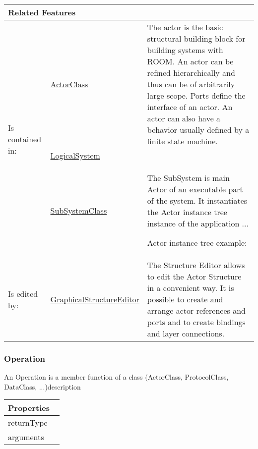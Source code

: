 			\vspace{\baselineskip}
			\begingroup
			\renewcommand{\arraystretch}{1.8} %
			\parbox{\textwidth}{
			\begin{longtable}{l l p{}}
				\multicolumn{2}{l}{\textbf{\large Related Features}} & \\
				\hline
			\multirow{3}{*}{Is contained in:} & \tabitem \hyperlink{ref:ActorClass}{ActorClass}  & The actor is the basic structural building block for building systems with ROOM. An actor can be refined hierarchically and thus can be of arbitrarily large scope. Ports define the interface of an actor. An actor can also have a behavior usually defined by a finite state machine. \\
			& \tabitem \hyperlink{ref:LogicalSystem}{LogicalSystem}  &  \\
			& \tabitem \hyperlink{ref:SubSystemClass}{SubSystemClass}  & The SubSystem is main Actor of an executable part of the system. It instantiates the Actor instance tree instance of the application ...
				
				Actor instance tree example:
				 \\
			\hline
			Is edited by: & \tabitem \hyperlink{ref:GraphicalStructureEditor}{GraphicalStructureEditor}  & The Structure Editor allows to edit the Actor Structure in a convenient way. It is possible to create and arrange actor references and ports and to create bindings and layer connections.\\
			\hline
			\end{longtable}	
			}
			\endgroup
			\vspace{\baselineskip}
			
			
		
		\subsubsection{Operation}
			\hypertarget{ref:Operation}{}
			
			An Operation is a member function of a class (ActorClass, ProtocolClass, DataClass, ...)description 
			
			\vspace{\baselineskip}
			\begingroup
			\renewcommand{\arraystretch}{1.8} %
			\parbox{\textwidth}{
			\begin{longtable}{l p{}}
				\multicolumn{2}{l}{\textbf{\large Properties}} \\
				\hline
			\tabitem returnType & \\
			\tabitem arguments & \\
			\end{longtable}	
			}
			\endgroup
			\vspace{\baselineskip}
			
